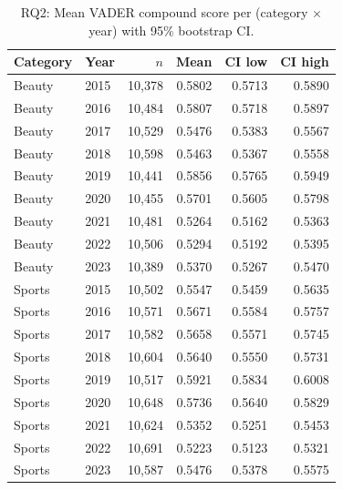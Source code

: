 \begin{table}[h]
\centering
\caption{RQ2: Mean VADER compound score per (category $\times$ year) with 95\% bootstrap CI.}
\label{tab:rq2_yearly_means}
\begin{tabular}{llrrrr}
\toprule
Category & Year & $n$ & Mean & CI low & CI high \\
\midrule
Beauty & 2015 & 10,378 & 0.5802 & 0.5713 & 0.5890 \\
Beauty & 2016 & 10,484 & 0.5807 & 0.5718 & 0.5897 \\
Beauty & 2017 & 10,529 & 0.5476 & 0.5383 & 0.5567 \\
Beauty & 2018 & 10,598 & 0.5463 & 0.5367 & 0.5558 \\
Beauty & 2019 & 10,441 & 0.5856 & 0.5765 & 0.5949 \\
Beauty & 2020 & 10,455 & 0.5701 & 0.5605 & 0.5798 \\
Beauty & 2021 & 10,481 & 0.5264 & 0.5162 & 0.5363 \\
Beauty & 2022 & 10,506 & 0.5294 & 0.5192 & 0.5395 \\
Beauty & 2023 & 10,389 & 0.5370 & 0.5267 & 0.5470 \\
Sports & 2015 & 10,502 & 0.5547 & 0.5459 & 0.5635 \\
Sports & 2016 & 10,571 & 0.5671 & 0.5584 & 0.5757 \\
Sports & 2017 & 10,582 & 0.5658 & 0.5571 & 0.5745 \\
Sports & 2018 & 10,604 & 0.5640 & 0.5550 & 0.5731 \\
Sports & 2019 & 10,517 & 0.5921 & 0.5834 & 0.6008 \\
Sports & 2020 & 10,648 & 0.5736 & 0.5640 & 0.5829 \\
Sports & 2021 & 10,624 & 0.5352 & 0.5251 & 0.5453 \\
Sports & 2022 & 10,691 & 0.5223 & 0.5123 & 0.5321 \\
Sports & 2023 & 10,587 & 0.5476 & 0.5378 & 0.5575 \\
\bottomrule
\end{tabular}
\end{table}